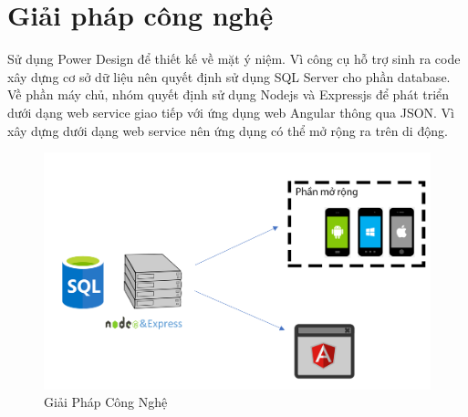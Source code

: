 \documentclass[12pt]{article}
\begin{document}
\section{Giải pháp công nghệ}
Sử dụng Power Design để thiết kế về mặt ý niệm. Vì công cụ hỗ trợ sinh ra code xây dựng cơ sở dữ liệu nên quyết định sử dụng SQL Server cho phần database.\\
Về phần máy chủ, nhóm quyết định sử dụng Nodejs và Expressjs để phát triển dưới dạng web service giao tiếp với ứng dụng web Angular thông qua JSON. Vì xây dựng dưới dạng web service nên ứng dụng có thể mở rộng ra trên di động.

\begin{figure}[H]
\centering
\includegraphics[scale = 0.9]{tech.png}
\caption{Giải Pháp Công Nghệ}
\end{figure}
\end{document}
